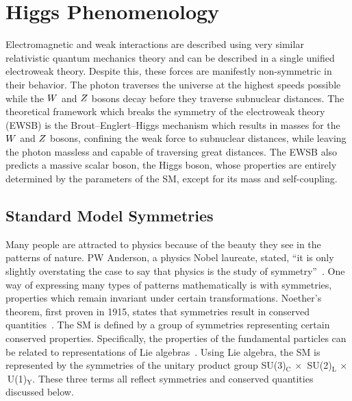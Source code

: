 \chapter{Higgs Phenomenology}
\label{sec:pheno}



Electromagnetic and weak interactions are described using very similar relativistic quantum mechanics 
theory and can be described in a single unified electroweak theory.
Despite this, these forces are manifestly non-symmetric in their behavior. The photon traverses the 
universe at the highest speeds possible while the $W$ and $Z$ bosons decay before they traverse 
subnuclear distances. The theoretical framework which breaks the symmetry of the electroweak theory (EWSB)
is the Brout--Englert--Higgs mechanism which results in masses for the $W$ and $Z$ bosons,
confining the weak force to subnuclear distances, while leaving the photon massless and capable of
traversing great distances.
The EWSB also predicts a massive scalar boson, the Higgs boson, whose properties are entirely 
determined by the parameters of the SM, except for its mass and self-coupling.

\section{Standard Model Symmetries}
Many people are attracted to physics because of the beauty they see in the patterns of nature.
PW Anderson, a physics Nobel laureate, stated, ``it is only slightly overstating the case 
to say that physics is the study of symmetry''~\cite{pw_anderson:1972}.
One way of expressing many types of patterns mathematically is with symmetries, properties which 
remain invariant under certain transformations. 
Noether's theorem, first proven in 1915, states that symmetries result in conserved quantities~\cite{Noether1918}. 
The SM is defined by a group of symmetries
representing certain conserved properties. Specifically, the properties of the fundamental
particles can be related to representations of Lie algebras~\cite{SLANSKY19811}.
Using Lie algebra, the SM is represented by the
symmetries of the unitary product group SU(3)$_{\text{C}} \,\times \,$ SU(2)$_{\text{L}} \, 
\times\,$ U(1)$_{\text{Y}}$.
These three terms all reflect symmetries and conserved quantities discussed below.

